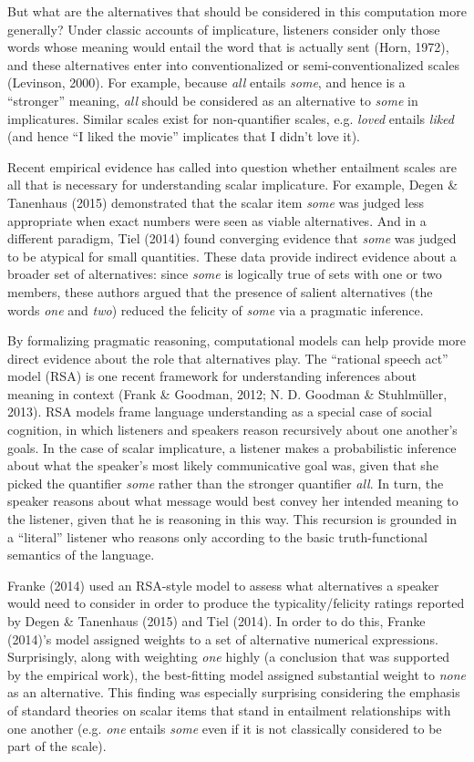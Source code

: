 \documentclass[10pt, letterpaper]{article}
\begin{document}
But what are the alternatives that should be considered in this
computation more generally? Under classic accounts of implicature,
listeners consider only those words whose meaning would entail the word
that is actually sent (Horn, 1972), and these alternatives enter into
conventionalized or semi-conventionalized scales (Levinson, 2000). For
example, because \emph{all} entails \emph{some}, and hence is a
``stronger'' meaning, \emph{all} should be considered as an alternative
to \emph{some} in implicatures. Similar scales exist for non-quantifier
scales, e.g. \emph{loved} entails \emph{liked} (and hence ``I liked the
movie'' implicates that I didn't love it).

Recent empirical evidence has called into question whether entailment
scales are all that is necessary for understanding scalar implicature.
For example, Degen \& Tanenhaus (2015) demonstrated that the scalar item
\emph{some} was judged less appropriate when exact numbers were seen as
viable alternatives. And in a different paradigm, Tiel (2014) found
converging evidence that \emph{some} was judged to be atypical for small
quantities. These data provide indirect evidence about a broader set of
alternatives: since \emph{some} is logically true of sets with one or
two members, these authors argued that the presence of salient
alternatives (the words \emph{one} and \emph{two}) reduced the felicity
of \emph{some} via a pragmatic inference.

By formalizing pragmatic reasoning, computational models can help
provide more direct evidence about the role that alternatives play. The
``rational speech act'' model (RSA) is one recent framework for
understanding inferences about meaning in context (Frank \& Goodman,
2012; N. D. Goodman \& Stuhlm{ü}ller, 2013). RSA models frame language
understanding as a special case of social cognition, in which listeners
and speakers reason recursively about one another's goals. In the case
of scalar implicature, a listener makes a probabilistic inference about
what the speaker's most likely communicative goal was, given that she
picked the quantifier \emph{some} rather than the stronger quantifier
\emph{all}. In turn, the speaker reasons about what message would best
convey her intended meaning to the listener, given that he is reasoning
in this way. This recursion is grounded in a ``literal'' listener who
reasons only according to the basic truth-functional semantics of the
language.

Franke (2014) used an RSA-style model to assess what alternatives a
speaker would need to consider in order to produce the
typicality/felicity ratings reported by Degen \& Tanenhaus (2015) and
Tiel (2014). In order to do this, Franke (2014)'s model assigned weights
to a set of alternative numerical expressions. Surprisingly, along with
weighting \emph{one} highly (a conclusion that was supported by the
empirical work), the best-fitting model assigned substantial weight to
\emph{none} as an alternative. This finding was especially surprising
considering the emphasis of standard theories on scalar items that stand
in entailment relationships with one another (e.g. \emph{one} entails
\emph{some} even if it is not classically considered to be part of the
scale).
\end{document}
